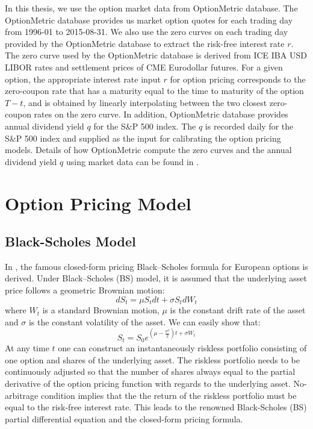 \documentclass[letterpaper,12pt,titlepage,oneside,final]{book}
\numberwithin{equation}{section}
\theoremstyle{definition}
\begin{document}
In this thesis, we use the option market data from OptionMetric \cite{optionmetrics2008ivy} database. The OptionMetric \cite{optionmetrics2008ivy} database provides us market option quotes for each trading day from 1996-01 to 2015-08-31.  We also use the zero curves on each trading day provided by the OptionMetric \cite{optionmetrics2008ivy} database to extract the risk-free interest rate $r$. The zero curve used by the OptionMetric database is derived from ICE IBA USD LIBOR rates and settlement prices of CME Eurodollar futures. For a given option, the appropriate interest rate input $r$ for option pricing corresponds to the zero-coupon rate that has a maturity equal to the time to maturity of the option $T-t$, and is obtained by linearly interpolating between the two closest zero-coupon rates on the zero curve. In addition, OptionMetric \cite{optionmetrics2008ivy} database provides annual  dividend yield $q$ for the S\&P 500 index. The $q$ is recorded daily for the S\&P 500 index and supplied as the input for calibrating the option pricing models.  Details of how OptionMetric compute the zero curves and the annual dividend yield $q$  using market data can be found in \cite{optionmetrics2008ivy}.





\section{Option Pricing Model}
\label{sec:pricing}
\subsection{Black-Scholes Model}
\label{sec:bs}


In  \cite{black1973pricing}, the famous closed-form pricing Black–Scholes formula for European options is derived. 
Under Black–Scholes (BS) model, it is assumed that the underlying asset price follows a geometric Brownian motion:
\[
dS_t=\mu S_t dt+\sigma S_t dW_t
\]
where $W_t$ is a standard Brownian motion, $\mu$ is the constant drift rate of  the asset and $\sigma$ is the constant volatility of the asset. We can easily show that:
\[
S_t=S_0 e^{(\mu-\frac{\sigma^2}{2})t+\sigma W_t}
\]
At any time $t$ one can construct an instantaneously riskless portfolio consisting of one option and shares of the underlying asset. The riskless portfolio needs to be continuously adjusted so that the number of shares always equal to the partial derivative of the option pricing function with regards to the underlying asset. No-arbitrage condition implies that the the return of the riskless portfolio must be equal to the risk-free interest rate. This leads to the renowned Black-Scholes (BS) partial differential equation and the closed-form pricing formula.
\end{document}

